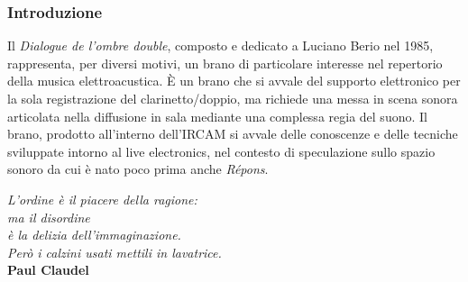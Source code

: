

\subsubsection*{Introduzione}


Il \emph{Dialogue de l'ombre double}, composto e dedicato a Luciano Berio nel 1985, rappresenta, per diversi motivi, un brano di particolare interesse nel repertorio della musica elettroacustica. È un brano che si avvale del supporto elettronico per la sola registrazione del clarinetto/doppio, ma richiede una messa in scena sonora articolata nella diffusione in sala mediante una complessa regia del suono. Il brano, prodotto all'interno dell'IRCAM si avvale delle conoscenze e delle tecniche sviluppate intorno al live electronics, nel contesto di speculazione sullo spazio sonoro da cui è nato poco prima anche \emph{Répons}.%

\clearpage

%
%

\begin{flushright}
{\small
\textit{
L'ordine è il piacere della ragione:\\ma il disordine\\ è la delizia dell'immaginazione.\\ Però i calzini usati mettili in lavatrice.\\
 }\textbf{Paul Claudel}}%
\end{flushright}

